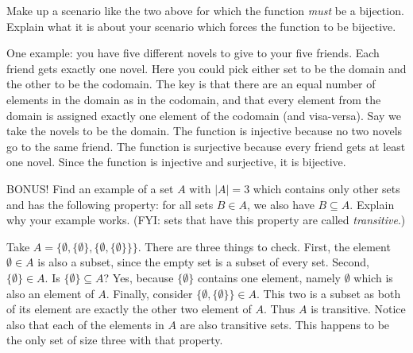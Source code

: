 \documentclass[11pt]{exam}
\begin{document}
\begin{questions}

\question[5] Make up a scenario like the two above for which the function {\em must} be a bijection.  Explain what it is about your scenario which forces the function to be bijective.

\begin{solution}
One example: you have five different novels to give to your five friends.  Each friend gets exactly one novel.  Here you could pick either set to be the domain and the other to be the codomain.  The key is that there are an equal number of elements in the domain as in the codomain, and that every element from the domain is assigned exactly one element of the codomain (and visa-versa).  Say we take the novels to be the domain.  The function is injective because no two novels go to the same friend.  The function is surjective because every friend gets at least one novel. Since the function is injective and surjective, it is bijective.
\end{solution}


\bonusquestion[3] BONUS! Find an example of a set $A$ with $|A| = 3$ which contains only other sets and  has the following property: for all sets $B \in A$, we also have $B \subseteq A$.  Explain why your example works.  (FYI: sets that have this property are called {\em transitive}.)

\begin{solution}
Take $A = \{\emptyset, \{\emptyset\}, \{\emptyset, \{\emptyset\}\}\}$.  There are three things to check.  First, the element $\emptyset \in A$ is also a subset, since the empty set is a subset of every set.  Second, $\{\emptyset\}\in A$.  Is $\{\emptyset\} \subseteq A$?  Yes, because $\{\emptyset\}$ contains one element, namely $\emptyset$ which is also an element of $A$.  Finally, consider $\{\emptyset, \{\emptyset\}\}\in A$.  This two is a subset as both of its element are exactly the other two element of $A$.  Thus $A$ is transitive.  Notice also that each of the elements in $A$ are also transitive sets.  This happens to be the only set of size three with that property.
\end{solution}


\end{questions}
\end{document}
